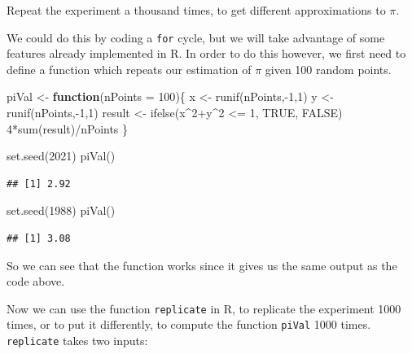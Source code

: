 \documentclass[
]{book}
\newenvironment{Shaded}{\begin{snugshade}}{\end{snugshade}}
\newcommand{\AttributeTok}[1]{\textcolor[rgb]{0.77,0.63,0.00}{#1}}
\newcommand{\ConstantTok}[1]{\textcolor[rgb]{0.00,0.00,0.00}{#1}}
\newcommand{\ControlFlowTok}[1]{\textcolor[rgb]{0.13,0.29,0.53}{\textbf{#1}}}
\newcommand{\DecValTok}[1]{\textcolor[rgb]{0.00,0.00,0.81}{#1}}
\newcommand{\FunctionTok}[1]{\textcolor[rgb]{0.00,0.00,0.00}{#1}}
\newcommand{\NormalTok}[1]{#1}
\newcommand{\OtherTok}[1]{\textcolor[rgb]{0.56,0.35,0.01}{#1}}
\newcommand{\SpecialCharTok}[1]{\textcolor[rgb]{0.00,0.00,0.00}{#1}}
\begin{document}
Repeat the experiment a thousand times, to get different approximations to \(\pi\).

We could do this by coding a \texttt{for} cycle, but we will take advantage of some features already implemented in R. In order to do this however, we first need to define a function which repeats our estimation of \(\pi\) given 100 random points.

\begin{Shaded}
\begin{Highlighting}[]
\NormalTok{piVal }\OtherTok{\textless{}{-}} \ControlFlowTok{function}\NormalTok{(}\AttributeTok{nPoints =} \DecValTok{100}\NormalTok{)\{}
\NormalTok{  x }\OtherTok{\textless{}{-}} \FunctionTok{runif}\NormalTok{(nPoints,}\SpecialCharTok{{-}}\DecValTok{1}\NormalTok{,}\DecValTok{1}\NormalTok{)}
\NormalTok{  y }\OtherTok{\textless{}{-}} \FunctionTok{runif}\NormalTok{(nPoints,}\SpecialCharTok{{-}}\DecValTok{1}\NormalTok{,}\DecValTok{1}\NormalTok{)}
\NormalTok{  result }\OtherTok{\textless{}{-}} \FunctionTok{ifelse}\NormalTok{(x}\SpecialCharTok{\^{}}\DecValTok{2}\SpecialCharTok{+}\NormalTok{y}\SpecialCharTok{\^{}}\DecValTok{2} \SpecialCharTok{\textless{}=} \DecValTok{1}\NormalTok{, }\ConstantTok{TRUE}\NormalTok{, }\ConstantTok{FALSE}\NormalTok{)}
  \DecValTok{4}\SpecialCharTok{*}\FunctionTok{sum}\NormalTok{(result)}\SpecialCharTok{/}\NormalTok{nPoints}
\NormalTok{\}}

\FunctionTok{set.seed}\NormalTok{(}\DecValTok{2021}\NormalTok{)}
\FunctionTok{piVal}\NormalTok{()}
\end{Highlighting}
\end{Shaded}

\begin{verbatim}
## [1] 2.92
\end{verbatim}

\begin{Shaded}
\begin{Highlighting}[]
\FunctionTok{set.seed}\NormalTok{(}\DecValTok{1988}\NormalTok{)}
\FunctionTok{piVal}\NormalTok{()}
\end{Highlighting}
\end{Shaded}

\begin{verbatim}
## [1] 3.08
\end{verbatim}

So we can see that the function works since it gives us the same output as the code above.

Now we can use the function \texttt{replicate} in R, to replicate the experiment 1000 times, or to put it differently, to compute the function \texttt{piVal} 1000 times. \texttt{replicate} takes two inputs:
\end{document}
